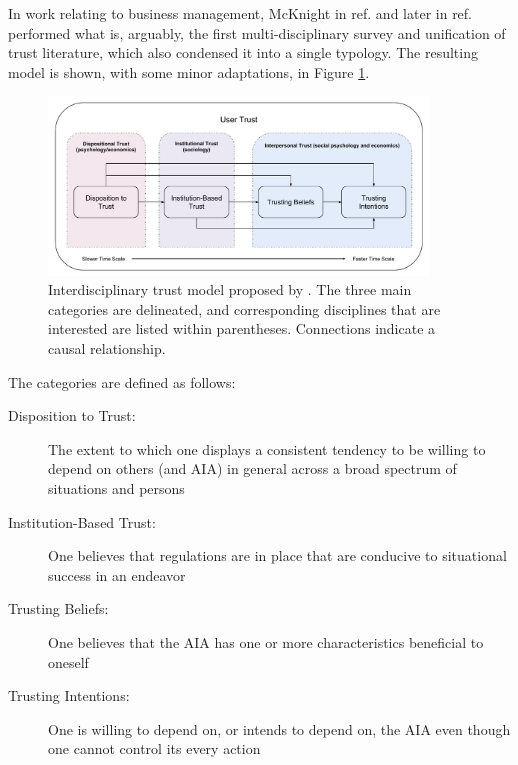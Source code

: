 In work relating to business management, McKnight in ref. \citet{McKnight1998-ty} and later in ref. \cite{McKnight2001-fa} performed what is, arguably, the first multi-disciplinary survey and unification of trust literature, which also condensed it into a single typology. The resulting model is shown, with some minor adaptations, in Figure \ref{fig:UserTrust}.

        \begin{figure}[htbp]
            \centering
            \includegraphics[width=0.9\textwidth]{Figures/UserTrust}
            \caption{Interdisciplinary trust model proposed by \citet{McKnight2001-fa}. The three main categories are delineated, and corresponding disciplines that are interested are listed within parentheses. Connections indicate a causal relationship.}
            \label{fig:UserTrust}
        \end{figure}

        The categories  are defined as follows: 

        \begin{description}
            \item [Disposition to Trust:] The extent to which one displays a consistent tendency to be willing to depend on others (and AIA) in general across a broad spectrum of situations and persons
            \item [Institution-Based Trust:] One believes that regulations are in place that are conducive to situational success in an endeavor
            \item [Trusting Beliefs:] One believes that the AIA has one or more characteristics beneficial to oneself
            \item [Trusting Intentions:] One is willing to depend on, or intends to depend on, the AIA even though one cannot control its every action
        \end{description}

